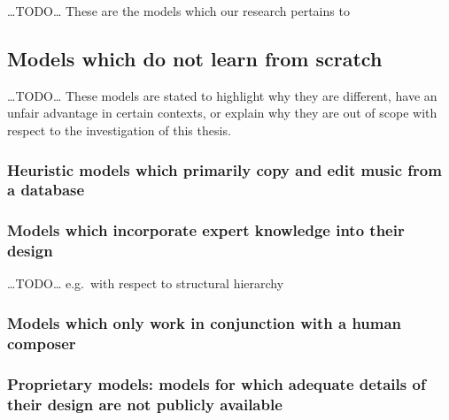 \documentclass[12pt,a4paper,]{report}
\begin{document}
\ldots TODO\ldots{} These are the models which our research pertains to

\hypertarget{models-which-do-not-learn-from-scratch}{%
\subsection{Models which do not learn from
scratch}\label{models-which-do-not-learn-from-scratch}}

\ldots TODO\ldots{} These models are stated to highlight why they are
different, have an unfair advantage in certain contexts, or explain why
they are out of scope with respect to the investigation of this thesis.

\hypertarget{heuristic-models-which-primarily-copy-and-edit-music-from-a-database}{%
\subsubsection{Heuristic models which primarily copy and edit music from
a
database}\label{heuristic-models-which-primarily-copy-and-edit-music-from-a-database}}

\hypertarget{models-which-incorporate-expert-knowledge-into-their-design}{%
\subsubsection{Models which incorporate expert knowledge into their
design}\label{models-which-incorporate-expert-knowledge-into-their-design}}

\ldots TODO\ldots{} e.g.~with respect to structural hierarchy

\hypertarget{models-which-only-work-in-conjunction-with-a-human-composer}{%
\subsubsection{Models which only work in conjunction with a human
composer}\label{models-which-only-work-in-conjunction-with-a-human-composer}}

\hypertarget{proprietary-models-models-for-which-adequate-details-of-their-design-are-not-publicly-available}{%
\subsubsection{Proprietary models: models for which adequate details of
their design are not publicly
available}\label{proprietary-models-models-for-which-adequate-details-of-their-design-are-not-publicly-available}}
\end{document}
